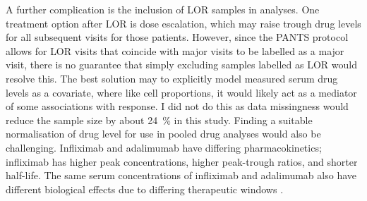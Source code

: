 A further complication is the inclusion of \gls{LOR} samples in analyses.
One treatment option after \gls{LOR} is dose escalation, which may raise trough drug levels for all subsequent visits for those patients.
However, since the \gls{PANTS} protocol allows for \gls{LOR} visits that coincide with major visits to be labelled as a major visit,
there is no guarantee that simply excluding samples labelled as \gls{LOR} would resolve this.
%
The best solution may to explicitly model measured serum drug levels as a covariate, where like cell proportions, it would likely act as a mediator of some associations with response.
I did not do this as data missingness would reduce the sample size by about \SI{24}{\percent} in this study.
Finding a suitable normalisation of drug level for use in pooled drug analyses would also be challenging.
Infliximab and adalimumab have differing pharmacokinetics; infliximab has higher peak concentrations, higher peak-trough ratios, and shorter half-life.
The same serum concentrations of infliximab and adalimumab also have different biological effects due to differing therapeutic windows
 \autocite{tracey2008TumorNecrosisFactor,lichtenstein2013ComprehensiveReviewAntitumor,gibson2020ReviewArticleDetermination}.

